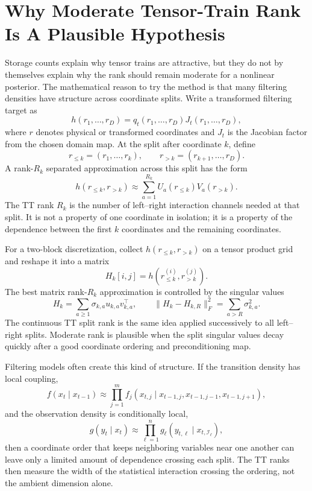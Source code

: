\documentclass[11pt]{article}
\begin{document}
\section{Why Moderate Tensor-Train Rank Is A Plausible Hypothesis}

Storage counts explain why tensor trains are attractive, but they do not by
themselves explain why the rank should remain moderate for a nonlinear
posterior.  The mathematical reason to try the method is that many filtering
densities have structure across coordinate splits.  Write a transformed
filtering target as
\[
    h(r_1,\ldots,r_D)
    =
    q_t(r_1,\ldots,r_D)
    J_t(r_1,\ldots,r_D),
    \label{eq:p24-rank-h}
\]
where \(r\) denotes physical or transformed coordinates and \(J_t\) is the
Jacobian factor from the chosen domain map.  At the split after coordinate
\(k\), define
\[
    r_{\le k}=(r_1,\ldots,r_k),\qquad
    r_{>k}=(r_{k+1},\ldots,r_D).
    \label{eq:p24-rank-split}
\]
A rank-\(R_k\) separated approximation across this split has the form
\[
    h(r_{\le k},r_{>k})
    \approx
    \sum_{a=1}^{R_k}
    U_a(r_{\le k})V_a(r_{>k}).
    \label{eq:p24-rank-separated}
\]
The TT rank \(R_k\) is the number of left--right interaction channels needed
at that split.  It is not a property of one coordinate in isolation; it is a
property of the dependence between the first \(k\) coordinates and the
remaining coordinates.

For a two-block discretization, collect \(h(r_{\le k},r_{>k})\) on a tensor
product grid and reshape it into a matrix
\[
    H_k[i,j]
    =
    h(r_{\le k}^{(i)},r_{>k}^{(j)}).
    \label{eq:p24-rank-unfold}
\]
The best matrix rank-\(R_k\) approximation is controlled by the singular values
\[
    H_k=\sum_{a\ge1}\sigma_{k,a}u_{k,a}v_{k,a}^{\top},
    \qquad
    \|H_k-H_{k,R}\|_F^2=\sum_{a>R}\sigma_{k,a}^2.
    \label{eq:p24-rank-svd}
\]
The continuous TT split rank is the same idea applied successively to all
left--right splits.  Moderate rank is plausible when the split singular values
decay quickly after a good coordinate ordering and preconditioning map.

Filtering models often create this kind of structure.  If the transition
density has local coupling,
\[
    f(x_t\mid x_{t-1})
    \approx
    \prod_{j=1}^m f_j(x_{t,j}\mid x_{t-1,j},x_{t-1,j-1},x_{t-1,j+1}),
    \label{eq:p24-rank-local-transition}
\]
and the observation density is conditionally local,
\[
    g(y_t\mid x_t)
    \approx
    \prod_{\ell=1}^n g_\ell(y_{t,\ell}\mid x_{t,\mathcal I_\ell}),
    \label{eq:p24-rank-local-observation}
\]
then a coordinate order that keeps neighboring variables near one another can
leave only a limited amount of dependence crossing each split.  The TT ranks
then measure the width of the statistical interaction crossing the ordering,
not the ambient dimension alone.
\end{document}
